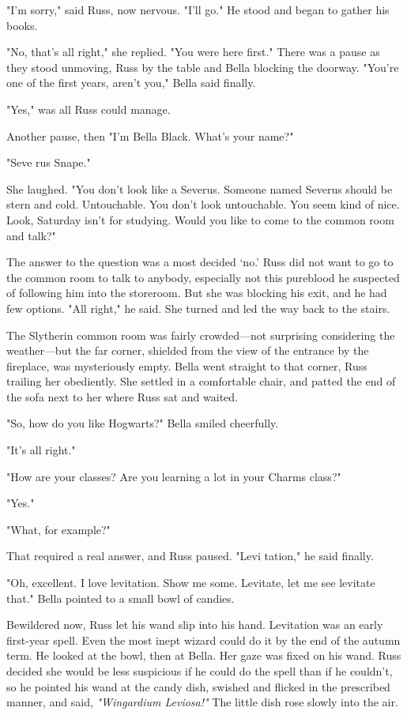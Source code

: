 "I'm{\el} sorry," said Russ, now nervous. "I'll{\el} go." He stood and began to gather his books.

"No, that's all right," she replied. "You were here first." There was a pause as they stood unmoving, Russ by the table and Bella blocking the doorway. "You're one of the first years, aren't you," Bella said finally.

"Yes," was all Russ could manage.

Another pause, then "I'm Bella Black. What's your name?"

"Seve{\el} rus Snape."

She laughed. "You don't look like a Severus. Someone named Severus should be stern and cold. Untouchable. You don't look untouchable. You seem kind of nice. Look, Saturday isn't for studying. Would you like to come to the common room and talk?"

The answer to the question was a most decided `no.' Russ did not want to go to the common room to talk to anybody, especially not this pureblood he suspected of following him into the storeroom. But she was blocking his exit, and he had few options. "All{\el} right," he said. She turned and led the way back to the stairs.

The Slytherin common room was fairly crowded—not surprising considering the weather—but the far corner, shielded from the view of the entrance by the fireplace, was mysteriously empty. Bella went straight to that corner, Russ trailing her obediently. She settled in a comfortable chair, and patted the end of the sofa next to her where Russ sat and waited.

"So, how do you like Hogwarts?" Bella smiled cheerfully.

"It's{\el} all{\el} right."

"How are your classes? Are you learning a lot in your Charms class?"

"Yes."

"What, for example?"

That required a real answer, and Russ paused. "Levi{\el} tation," he said finally.

"Oh, excellent. I love levitation. Show me some. Levitate, let me see{\el} levitate that." Bella pointed to a small bowl of candies.

Bewildered now, Russ let his wand slip into his hand. Levitation was an early first-year spell. Even the most inept wizard could do it by the end of the autumn term. He looked at the bowl, then at Bella. Her gaze was fixed on his wand. Russ decided she would be less suspicious if he could do the spell than if he couldn't, so he pointed his wand at the candy dish, swished and flicked in the prescribed manner, and said, \emph{"Wingardium Leviosa!"} The little dish rose slowly into the air.

